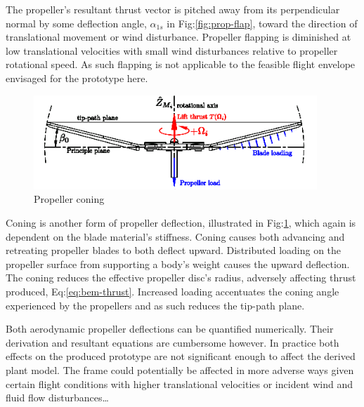 \par
The propeller's resultant thrust vector is pitched away from its perpendicular normal by some deflection angle, $\alpha_{1s}$ in Fig:\ref{fig:prop-flap}, toward the direction of translational movement or wind disturbance. Propeller flapping is diminished at low translational velocities with small wind disturbances relative to propeller rotational speed. As such flapping is not applicable to the feasible flight envelope envisaged for the prototype here.
\par
\begin{figure}[hbtp]
\centering
\includegraphics[width=0.95\textwidth]{figs/prop-coning}
\caption{Propeller coning}
\label{fig:prop-coning}
\end{figure}
Coning is another form of propeller deflection, illustrated in Fig:\ref{fig:prop-coning}, which again is dependent on the blade material's stiffness. Coning causes both advancing and retreating propeller blades to both deflect upward. Distributed loading on the propeller surface from supporting a body's weight causes the upward deflection. The coning reduces the effective propeller disc's radius, adversely affecting thrust produced, Eq:\ref{eq:bem-thrust}. Increased loading accentuates the coning angle experienced by the propellers and as such reduces the tip-path plane.
\par
Both aerodynamic propeller deflections can be quantified numerically. Their derivation and resultant equations are cumbersome however. In practice both effects on the produced prototype are not significant enough to affect the derived plant model. The frame could potentially be affected in more adverse ways given certain flight conditions with higher translational velocities or incident wind and fluid flow disturbances\ldots

